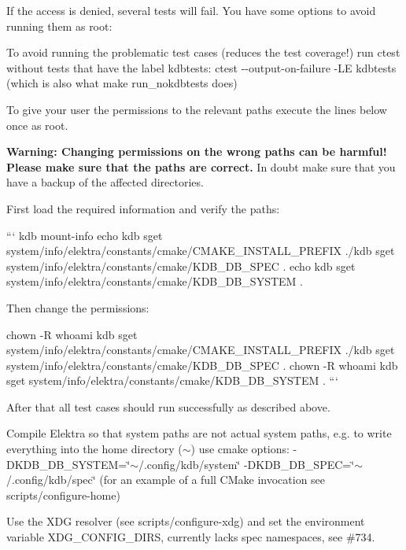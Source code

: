 If the access is denied, several tests will fail. You have some options to avoid running them as root\+:


\begin{DoxyEnumerate}
\item To avoid running the problematic test cases (reduces the test coverage!) run {\ttfamily ctest} without tests that have the label {\ttfamily kdbtests}\+: {\ttfamily ctest -\/-\/output-\/on-\/failure -\/\+LE kdbtests} (which is also what {\ttfamily make run\+\_\+nokdbtests} does)
\item To give your user the permissions to the relevant paths execute the lines below once as root.

{\bfseries Warning\+: Changing permissions on the wrong paths can be harmful! Please make sure that the paths are correct.} In doubt make sure that you have a backup of the affected directories.

First load the required information and verify the paths\+:

``` kdb mount-\/info echo {\ttfamily kdb sget system/info/elektra/constants/cmake/\+C\+M\+A\+K\+E\+\_\+\+I\+N\+S\+T\+A\+L\+L\+\_\+\+P\+R\+E\+F\+IX .}/{\ttfamily kdb sget system/info/elektra/constants/cmake/\+K\+D\+B\+\_\+\+D\+B\+\_\+\+S\+P\+EC .} echo {\ttfamily kdb sget system/info/elektra/constants/cmake/\+K\+D\+B\+\_\+\+D\+B\+\_\+\+S\+Y\+S\+T\+EM .} 
\begin{DoxyCode}
Then change the permissions:
\end{DoxyCode}
 chown -\/R {\ttfamily whoami} {\ttfamily kdb sget system/info/elektra/constants/cmake/\+C\+M\+A\+K\+E\+\_\+\+I\+N\+S\+T\+A\+L\+L\+\_\+\+P\+R\+E\+F\+IX .}/{\ttfamily kdb sget system/info/elektra/constants/cmake/\+K\+D\+B\+\_\+\+D\+B\+\_\+\+S\+P\+EC .} chown -\/R {\ttfamily whoami} {\ttfamily kdb sget system/info/elektra/constants/cmake/\+K\+D\+B\+\_\+\+D\+B\+\_\+\+S\+Y\+S\+T\+EM .} ```

After that all test cases should run successfully as described above.
\item Compile Elektra so that system paths are not actual system paths, e.\+g. to write everything into the home directory ({\ttfamily $\sim$}) use cmake options\+: {\ttfamily -\/\+D\+K\+D\+B\+\_\+\+D\+B\+\_\+\+S\+Y\+S\+T\+EM=\char`\"{}$\sim$/.\+config/kdb/system\char`\"{} -\/\+D\+K\+D\+B\+\_\+\+D\+B\+\_\+\+S\+P\+EC=\char`\"{}$\sim$/.\+config/kdb/spec\char`\"{}} (for an example of a full C\+Make invocation see {\ttfamily scripts/configure-\/home})
\item Use the X\+DG resolver (see {\ttfamily scripts/configure-\/xdg}) and set the environment variable {\ttfamily X\+D\+G\+\_\+\+C\+O\+N\+F\+I\+G\+\_\+\+D\+I\+RS}, currently lacks {\ttfamily spec} namespaces, see \#734.
\end{DoxyEnumerate}

